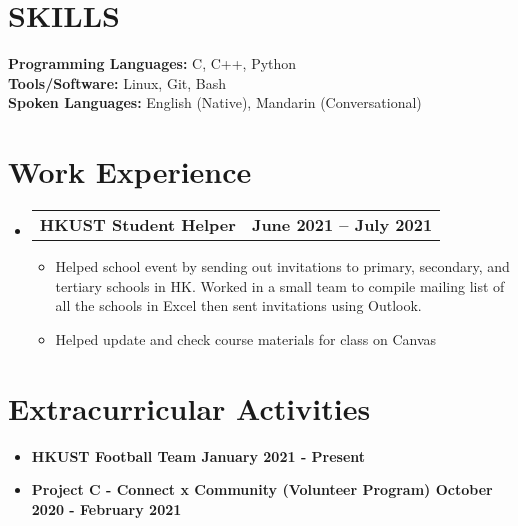 \documentclass[letterpaper,11pt]{article}
\makeatletter
\newcommand{\resumeItem}[1]{
  \item\small{
    {#1 \vspace{-2pt}}
  }
}
\newcommand{\resumeSubheading}[4]{
  \vspace{-2pt}\item
    \begin{tabular*}{1.0\textwidth}[t]{l@{\extracolsep{\fill}}r}
      \textbf{\large#1} & \textbf{\small #2} \\
    \end{tabular*}\vspace{-7pt}
}
\newcommand{\resumeSubHeadingListStart}{\begin{itemize}[leftmargin=0.0in, label={}]}
\newcommand{\resumeSubHeadingListEnd}{\end{itemize}}
\newcommand{\resumeItemListStart}{\begin{itemize}}
\newcommand{\resumeItemListEnd}{\end{itemize}\vspace{-5pt}}
\makeatother
\begin{document}
\section{SKILLS}
 \begin{itemize}[leftmargin=0.15in, label={}]
    \small{\item{
     \textbf{\normalsize{Programming Languages:}}{ \normalsize{C, C++, Python}} \\
     \vspace{1pt}
     \textbf{\normalsize{Tools/Software:}}{\normalsize{ Linux, Git, Bash}} \\
     \vspace{1pt}
     \textbf{\normalsize{Spoken Languages:}}{\normalsize{ English (Native), Mandarin (Conversational)}} \\
    }}
 \end{itemize}
\vspace{1pt}

\section{Work Experience}
  \resumeSubHeadingListStart
    \vspace{3pt}
    \resumeSubheading
      {HKUST Student Helper}{June 2021 -- July 2021} 
      {}{}
      \resumeItemListStart
        \resumeItem{\normalsize{Helped school event by sending out invitations to primary, secondary, and tertiary schools in HK. Worked in a small team to compile mailing list of all the schools in Excel then sent invitations using Outlook.}}
        \resumeItem{\normalsize{Helped update and check course materials for class on Canvas}}
      \resumeItemListEnd  
  \resumeSubHeadingListEnd
\vspace{1pt}

\section{Extracurricular Activities}
    \begin{itemize}[itemsep=-2pt, parsep=5pt] 
        \item \textbf {HKUST Football Team \hfill January 2021 - Present}
        \item \textbf {Project C - Connect x Community (Volunteer Program) \hfill October 2020 - February 2021}
    \end{itemize}
\end{document}
